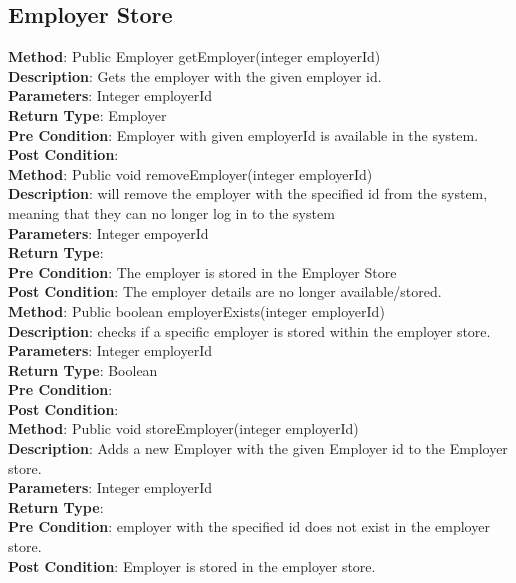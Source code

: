 \documentclass{l3deliverable}
\begin{document}
\subsection{Employer Store}

\textbf{Method}: Public Employer getEmployer(integer employerId)\\
\textbf{Description}: Gets the employer with the given employer id.\\
\textbf{Parameters}:  Integer employerId\\
\textbf{Return Type}: Employer\\
\textbf{Pre Condition}: Employer with given employerId is available in the system.\\
\textbf{Post Condition}:\\

\textbf{Method}: Public void removeEmployer(integer employerId) \\
\textbf{Description}: will remove the employer with the specified id from the system, meaning that they can no longer log in to the system\\
\textbf{Parameters}: Integer empoyerId\\
\textbf{Return Type}:\\
\textbf{Pre Condition}: The employer is stored in the Employer Store\\
\textbf{Post Condition}: The employer details are no longer available/stored.\\

\textbf{Method}: Public boolean employerExists(integer employerId) \\
\textbf{Description}: checks if a specific employer is stored within the employer store.\\
\textbf{Parameters}: Integer employerId\\
\textbf{Return Type}: Boolean\\
\textbf{Pre Condition}:\\
\textbf{Post Condition}:\\

\textbf{Method}: Public void storeEmployer(integer employerId) \\
\textbf{Description}:  Adds a new Employer with the given Employer id to the Employer store.\\
\textbf{Parameters}: Integer employerId\\
\textbf{Return Type}:\\
\textbf{Pre Condition}: employer with the specified id does not exist in the employer store.\\
\textbf{Post Condition}: Employer is stored in the employer store.\\
\end{document}
